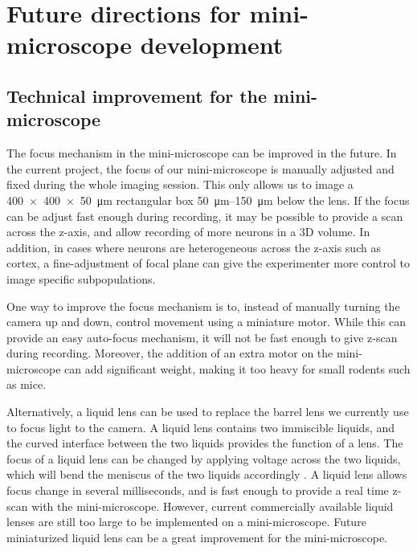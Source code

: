 \section{Future directions for mini-microscope development}
\subsection{Technical improvement for the mini-microscope}

The focus mechanism in the mini-microscope can be improved in the future. In the current project, the focus of our mini-microscope is manually adjusted and fixed during the whole imaging session. This only allows us to image a \SI{400x400x50}{\um} rectangular box \SIrange{50}{150}{\um} below the lens. If the focus can be adjust fast enough during recording, it may be possible to provide a scan across the z-axis, and allow recording of more neurons in a 3D volume. In addition, in cases where neurons are heterogeneous across the z-axis such as cortex, a fine-adjustment of focal plane can give the experimenter more control to image specific subpopulations.

One way to improve the focus mechanism is to, instead of manually turning the camera up and down, control movement using a miniature motor. While this can provide an easy auto-focus mechanism, it will not be fast enough to give z-scan during recording. Moreover, the addition of an extra motor on the mini-microscope can add significant weight, making it too heavy for small rodents such as mice. 

Alternatively, a liquid lens can be used to replace the barrel lens we currently use to focus light to the camera. A liquid lens contains two immiscible liquids, and the curved interface between the two liquids provides the function of a lens. The focus of a liquid lens can be changed by applying voltage across the two liquids, which will bend the meniscus of the two liquids accordingly \citep{kuiper04}. A liquid lens allows focus change in several milliseconds, and is fast enough to provide a real time z-scan with the mini-microscope. However, current commercially available liquid lenses are still too large to be implemented on a mini-microscope. Future miniaturized liquid lens can be a great improvement for the mini-microscope.

